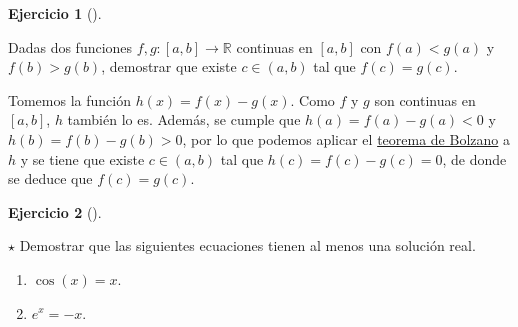 \documentclass[
  spanish,
  a4paper,
]{scrreport}
\providecommand{\tightlist}{%
  \setlength{\itemsep}{0pt}\setlength{\parskip}{0pt}}
\theoremstyle{definition}
\newtheorem{exercise}{Ejercicio}[chapter]
\theoremstyle{remark}
\begin{document}
\begin{exercise}[]\protect\hypertarget{exr-valor-intermedio}{}\label{exr-valor-intermedio}

Dadas dos funciones \(f,g:[a,b]\to\mathbb{R}\) continuas en \([a,b]\)
con \(f(a)<g(a)\) y \(f(b)>g(b)\), demostrar que existe \(c\in(a,b)\)
tal que \(f(c)=g(c)\).

\end{exercise}

\begin{tcolorbox}[enhanced jigsaw, arc=.35mm, bottomrule=.15mm, bottomtitle=1mm, breakable, colback=white, colbacktitle=quarto-callout-tip-color!10!white, colframe=quarto-callout-tip-color-frame, coltitle=black, left=2mm, leftrule=.75mm, opacityback=0, opacitybacktitle=0.6, rightrule=.15mm, title=\textcolor{quarto-callout-tip-color}{\faLightbulb}\hspace{0.5em}{Solución}, titlerule=0mm, toprule=.15mm, toptitle=1mm]

Tomemos la función \(h(x)=f(x)-g(x)\). Como \(f\) y \(g\) son continuas
en \([a,b]\), \(h\) también lo es. Además, se cumple que
\(h(a)=f(a)-g(a)<0\) y \(h(b)=f(b)-g(b)>0\), por lo que podemos aplicar
el
\href{https://aprendeconalf.es/analisis-manual/06-limites.html\#thm-bolzano}{teorema
de Bolzano} a \(h\) y se tiene que existe \(c\in(a,b)\) tal que
\(h(c)=f(c)-g(c)=0\), de donde se deduce que \(f(c)=g(c)\).

\end{tcolorbox}

\begin{exercise}[]\protect\hypertarget{exr-valor-intermedio-2}{}\label{exr-valor-intermedio-2}

\(\star\) Demostrar que las siguientes ecuaciones tienen al menos una
solución real.

\begin{enumerate}
\def\labelenumi{\alph{enumi}.}
\tightlist
\item
  \(\cos(x)=x\).
\item
  \(e^x = -x\).
\end{enumerate}

\end{exercise}
\end{document}
